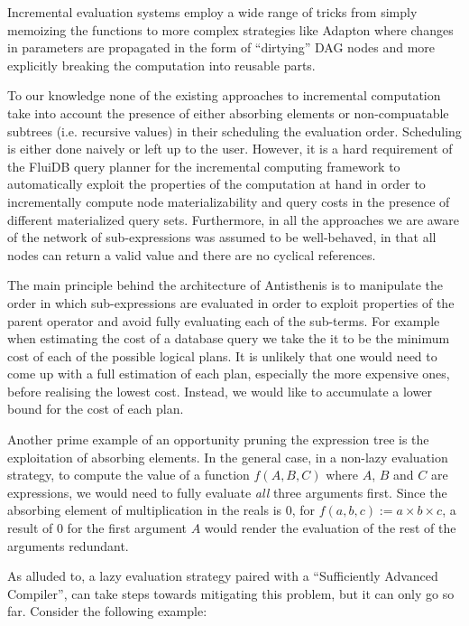 Incremental evaluation systems employ a wide range of tricks from
simply memoizing the functions
\cite{pughIncrementalComputationFunction1989} to more complex
strategies like Adapton
\cite{hammerAdaptonComposableDemanddriven2014a} where changes in
parameters are propagated in the form of ``dirtying'' DAG nodes and
more explicitly breaking the computation into reusable parts.

To our knowledge none of the existing approaches to incremental
computation take into account the presence of either absorbing
elements or non-compuatable subtrees (i.e. recursive values) in their
scheduling the evaluation order. Scheduling is either done naively or
left up to the user. However, it is a hard requirement of the FluiDB
query planner for the incremental computing framework to automatically
exploit the properties of the computation at hand in order to
incrementally compute node materializability and query costs in the
presence of different materialized query sets. Furthermore, in all the
approaches we are aware of the network of sub-expressions was assumed
to be well-behaved, in that all nodes can return a valid value and
there are no cyclical references.

The main principle behind the architecture of Antisthenis is to
manipulate the order in which sub-expressions are evaluated in order
to exploit properties of the parent operator and avoid fully
evaluating each of the sub-terms. For example when estimating the cost
of a database query we take the it to be the minimum cost of each of
the possible logical plans. It is unlikely that one would need to come
up with a full estimation of each plan, especially the more expensive
ones, before realising the lowest cost. Instead, we would like to
accumulate a lower bound for the cost of each plan.

Another prime example of an opportunity pruning the expression tree is
the exploitation of absorbing elements. In the general case, in a
non-lazy evaluation strategy, to compute the value of a function
\(f(A,B,C)\) where \(A\), \(B\) and \(C\) are expressions, we would
need to fully evaluate \emph{all} three arguments first. Since the
absorbing element of multiplication in the reals is 0, for
\(f(a,b,c) := a \times b \times c\), a result of 0 for the first
argument \(A\) would render the evaluation of the rest of the
arguments redundant.

As alluded to, a lazy evaluation strategy paired with a ``Sufficiently
Advanced Compiler'', can take steps towards mitigating this problem,
but it can only go so far. Consider the following example:

